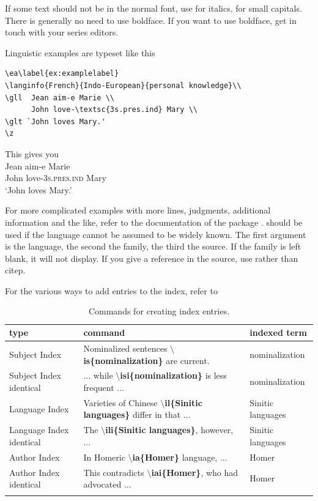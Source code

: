 If some text should not be in the normal font, use 
 for italics, 
 for small capitals. There is generally no need to use boldface. If you want to use boldface, get in touch with your series editors.

Linguistic examples are typeset like this

\begin{verbatim}
\ea\label{ex:examplelabel}
\langinfo{French}{Indo-European}{personal knowledge}\\
\gll  Jean aim-e Marie \\
      John love-\textsc{3s.pres.ind} Mary \\
\glt `John loves Mary.'    
\z
\end{verbatim}

This gives you
\ea\label{ex:examplelabel}
\\
\gll  Jean aim-e Marie \\
      John love-\textsc{3s.pres.ind} Mary \\
\glt `John loves Mary.'    
\z

For more complicated examples with more lines, judgments, additional information and the like, refer to the documentation of the package .
 should be used if the language cannot be assumed to be widely known. The first argument is the language, the second the family, the third the source. If the family is left blank, it will not display. If you give a reference in the source, use  rather than {{\bs}citep}.

For the various ways to add entries to the index, refer to 

\begin{table}[h]
\caption{Commands for creating index entries.}
\label{tab:latex:indexentriese}
 \begin{tabular}{p{2.5cm}>{\tt\small\raggedright}p{6.5cm}p{3cm}}
  \lsptoprule
  type & \rm\normalsize command & indexed term \\
  \midrule
  Subject Index& Nominalized sentences \textbf{$\setminus$is\{nominalization\}} are current. & nomina\-lization \\
  Subject Index identical& ... while \textbf{$\setminus$isi\{nominalization\}} is less frequent ...  & nomina\-lization \\[2em]
  Language Index & Varieties of Chinese \textbf{$\setminus$il\{Sinitic languages\}} differ in that ...& Sinitic languages \\
  Language Index identical& The \textbf{$\setminus$ili\{Sinitic languages\}}, \mbox{however}, ... & Sinitic languages \\[2em]
  Author Index & In Homeric \textbf{$\setminus$ia\{Homer\}} language, ...  & Homer\\
  Author Index identical & This contradicts \textbf{$\setminus$iai\{Homer\}}, who had advocated ... & Homer \\
  \lspbottomrule
 \end{tabular}

\end{table}

